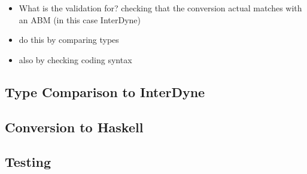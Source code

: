 \documentclass{article}
\begin{document}
 
%	







\begin{itemize}
  \item What is the validation for? checking that the conversion actual matches with an ABM (in this case InterDyne)
  \item do this by comparing types 
  \item also by checking coding syntax 
\end{itemize}


\subsection{Type Comparison to InterDyne}


\subsection{Conversion to Haskell}

\subsection{Testing}
\end{document}
